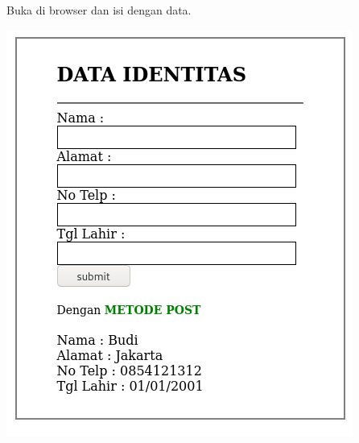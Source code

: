 \documentclass[a4paper,12pt]{article}
\begin{document}
Buka di browser dan isi dengan data.
\begin{center}
    \includegraphics[scale=.6]{5.png} 
\end{center}

\newpage
\end{document}
